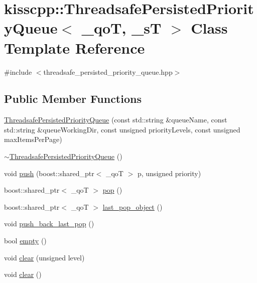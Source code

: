 \hypertarget{classkisscpp_1_1_threadsafe_persisted_priority_queue}{\section{kisscpp\-:\-:Threadsafe\-Persisted\-Priority\-Queue$<$ \-\_\-qo\-T, \-\_\-s\-T $>$ Class Template Reference}
\label{classkisscpp_1_1_threadsafe_persisted_priority_queue}
}


{\ttfamily \#include $<$threadsafe\-\_\-persisted\-\_\-priority\-\_\-queue.\-hpp$>$}

\subsection*{Public Member Functions}
\begin{DoxyCompactItemize}
\item 
\hyperlink{classkisscpp_1_1_threadsafe_persisted_priority_queue_ad93da6323ca757793d77379d9dbf28a7}{Threadsafe\-Persisted\-Priority\-Queue} (const std\-::string \&queue\-Name, const std\-::string \&queue\-Working\-Dir, const unsigned priority\-Levels, const unsigned max\-Items\-Per\-Page)
\item 
\hyperlink{classkisscpp_1_1_threadsafe_persisted_priority_queue_a595ff6bfbc443d50b5f280711618fc9d}{$\sim$\-Threadsafe\-Persisted\-Priority\-Queue} ()
\item 
void \hyperlink{classkisscpp_1_1_threadsafe_persisted_priority_queue_a593f66f576c7d4502e44529efbfad7d0}{push} (boost\-::shared\-\_\-ptr$<$ \-\_\-qo\-T $>$ p, unsigned priority)
\item 
boost\-::shared\-\_\-ptr$<$ \-\_\-qo\-T $>$ \hyperlink{classkisscpp_1_1_threadsafe_persisted_priority_queue_a34be1a3216d514fdf5263a3b65eb3d87}{pop} ()
\item 
boost\-::shared\-\_\-ptr$<$ \-\_\-qo\-T $>$ \hyperlink{classkisscpp_1_1_threadsafe_persisted_priority_queue_aa0bd8c361a95ae5ed3e15621178a2d65}{last\-\_\-pop\-\_\-object} ()
\item 
void \hyperlink{classkisscpp_1_1_threadsafe_persisted_priority_queue_a43706bc9b32eb6b4f8a89242818d7e51}{push\-\_\-back\-\_\-last\-\_\-pop} ()
\item 
bool \hyperlink{classkisscpp_1_1_threadsafe_persisted_priority_queue_ab45f3294d86458e714364dec22a9980c}{empty} ()
\item 
void \hyperlink{classkisscpp_1_1_threadsafe_persisted_priority_queue_aafe0d24defdf58523c7e6532055569e5}{clear} (unsigned level)
\item 
void \hyperlink{classkisscpp_1_1_threadsafe_persisted_priority_queue_a17e86ea47a27497f4396f84e9ad1b314}{clear} ()
\end{DoxyCompactItemize}


